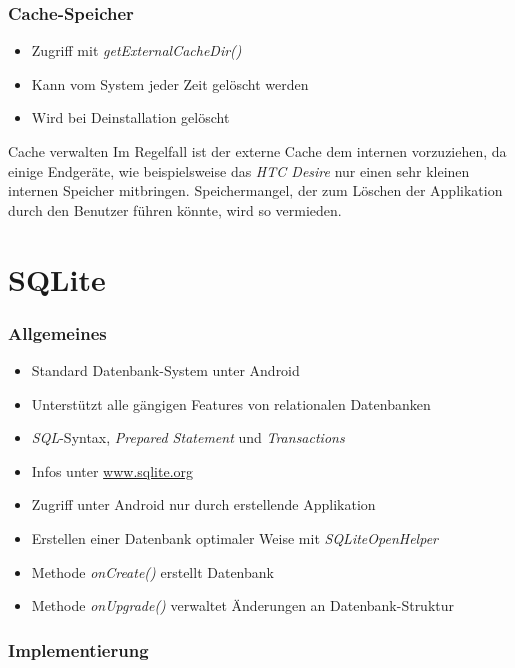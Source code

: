 \begin{frame}
   \frametitle{Cache-Speicher}
   \begin{itemize}
   	\item Zugriff mit \emph{getExternalCacheDir()} 
   	\item Kann vom System jeder Zeit gelöscht werden
   	\item Wird bei Deinstallation gelöscht
   \end{itemize}

	\begin{alertblock}{Cache verwalten}
		Im Regelfall ist der externe Cache dem internen vorzuziehen, da einige 
		Endgeräte, wie beispielsweise das \emph{HTC Desire} nur einen sehr kleinen 
		internen Speicher mitbringen. Speichermangel, der zum Löschen der Applikation 
		durch den Benutzer führen könnte, wird so vermieden.
	\end{alertblock}
\end{frame}

\section{SQLite}
\begin{frame}
   \frametitle{Allgemeines}
   \begin{itemize}
   	\item Standard Datenbank-System unter Android
   	\item Unterstützt alle gängigen Features von relationalen Datenbanken
   	\item \emph{SQL}-Syntax, \emph{Prepared Statement} und \emph{Transactions}
   	\item Infos unter \href{www.sqlite.org}{www.sqlite.org}
   	\item Zugriff unter Android nur durch erstellende Applikation
   	\item Erstellen einer Datenbank optimaler Weise mit \emph{SQLiteOpenHelper}
   	\item Methode \emph{onCreate()} erstellt Datenbank
   	\item Methode \emph{onUpgrade()} verwaltet Änderungen an Datenbank-Struktur
   \end{itemize}
\end{frame}

\begin{frame}
   \frametitle{Implementierung}
	
\end{frame}

